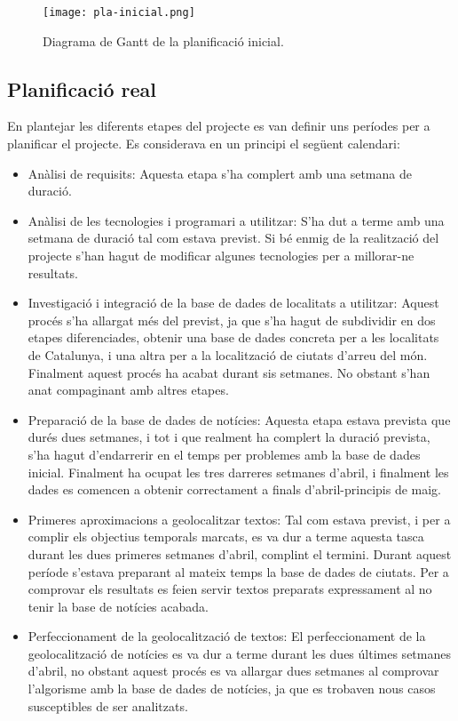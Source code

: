 \documentclass[12pt,a4paper,openright,oneside]{article}
\numberwithin{equation}{section}
\theoremstyle{definition}
\begin{document}
\begin{figure}[!htbp]
\centering
\texttt{[image: pla-inicial.png]}
\caption{Diagrama de Gantt de la planificació inicial.}
\end{figure}
\subsection{Planificació real}
En plantejar les diferents etapes del projecte es van definir uns períodes per a planificar el projecte. Es considerava en un principi el següent calendari:
\begin{itemize}
\item Anàlisi de requisits: Aquesta etapa s'ha complert amb una setmana de duració.
\item Anàlisi de les tecnologies i programari a utilitzar: S'ha dut a terme amb una setmana de duració tal com estava previst. Si bé enmig de la realització del projecte s'han hagut de modificar algunes tecnologies per a millorar-ne resultats.
\item Investigació i integració de la base de dades de localitats a utilitzar: Aquest procés s'ha allargat més del previst, ja que s'ha hagut de subdividir en dos etapes diferenciades, obtenir una base de dades concreta per a les localitats de Catalunya, i una altra per a la localització de ciutats d'arreu del món. Finalment aquest procés ha acabat durant sis setmanes. No obstant s'han anat compaginant amb altres etapes.
\item Preparació de la base de dades de notícies: Aquesta etapa estava prevista que durés dues setmanes, i tot i que realment ha complert la duració prevista, s'ha hagut d'endarrerir en el temps per problemes amb la base de dades inicial. Finalment ha ocupat les tres darreres setmanes d'abril, i finalment les dades es comencen a obtenir correctament a finals d'abril-principis de maig.
\item Primeres aproximacions a geolocalitzar textos: Tal com estava previst, i per a complir els objectius temporals marcats, es va dur a terme aquesta tasca durant les dues primeres setmanes d'abril, complint el termini. Durant aquest període s'estava preparant al mateix temps la base de dades de ciutats. Per a comprovar els resultats es feien servir textos preparats expressament al no tenir la base de notícies acabada.
\item Perfeccionament de la geolocalització de textos: El perfeccionament de la geolocalització de notícies es va dur a terme durant les dues últimes setmanes d'abril, no obstant aquest procés es va allargar dues setmanes al comprovar l'algorisme amb la base de dades de notícies, ja que es trobaven nous casos susceptibles de ser analitzats.

\end{itemize}
\end{document}
